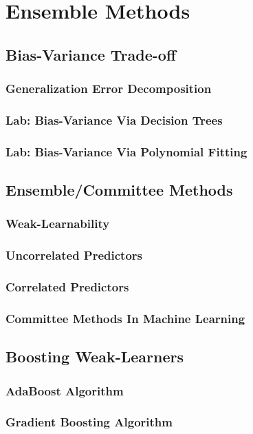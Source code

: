 \chapter{Ensemble Methods}
    \section{Bias-Variance Trade-off}
        \subsection{Generalization Error Decomposition}
        \subsection{Lab: Bias-Variance Via Decision Trees}
        \subsection{Lab: Bias-Variance Via Polynomial Fitting}
        
    \section{Ensemble/Committee Methods}
        \subsection{Weak-Learnability}
        \subsection{Uncorrelated Predictors}
        \subsection{Correlated Predictors}
        \subsection{Committee Methods In Machine Learning}
    
    \section{Boosting Weak-Learners}
        \subsection{AdaBoost Algorithm}
        \subsection{Gradient Boosting Algorithm}
